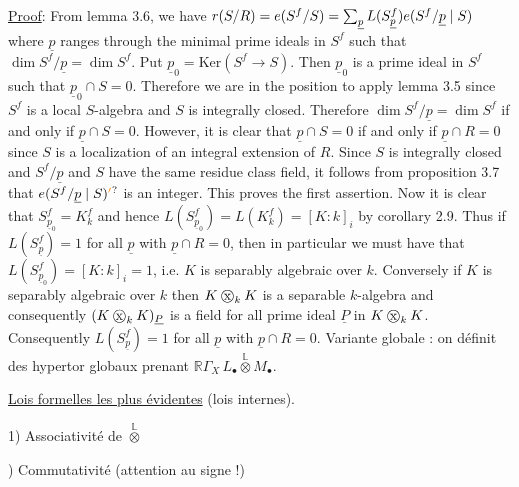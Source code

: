\uline{Proof}: From lemma 3.6, we have $r(S/R)=e(S^f/S)=\sum_{\underline p}L(S^f_{\underline p})e(S^f/\underline p\mid S)$ where $\underline p$ ranges through the minimal prime ideals in $S^f$ such that $\dim S^f/\underline p=\dim S^f$. Put $\underline p_0=\mathrm{Ker}(S^f\longrightarrow S)$. Then $\underline p_0$ is a prime ideal in $S^f$ such that $\underline p_0\cap S=0$. Therefore we are in the position to apply lemma 3.5 since $S^f$ is a local $S$-algebra and $S$ is integrally closed. Therefore $\dim S^f/\underline p=\dim S^f$ if and only if $\underline p\cap S=0$. However, it is clear that $\underline p\cap S=0$ if and only if $\underline p\cap R=0$ since $S$ is a localization of an integral extension of $R$. Since $S$ is integrally closed and $S^f/\underline p$ and $S$ have the same residue class field, it follows from proposition 3.7 that $e(S^f/\underline p\mid S\handwritten{)}\unsure{'}$ is an integer. This proves the first assertion. Now it is clear that $S^f_{\underline p_0}=K^f_k$ and hence $L(S^f_{\underline p_0})=L(K^f_k)=[K:k]_i$ by corollary 2.9. Thus if $L(S^f_{\underline p})=1$ for all $\underline p$ with $\underline p\cap R=0$, then in particular we must have that $L(S^f_{\underline p_0})=[K:k]_i=1$, i.e. $K$ is separably algebraic over $k$. Conversely if $K$ is separably algebraic over $k$ then $K\mathbin{\ooalign{\hfil$\mathrm{x}$\hfil\cr\hfil$\handwritten{\bigcirc}$\hfil\cr}}_k K$ is a separable $k$-algebra and consequently $(K\mathbin{\ooalign{\hfil$\mathrm{x}$\hfil\cr\hfil$\handwritten{\bigcirc}$\hfil\cr}}_k K)_{\underline P}$ is a field for all prime ideal $\underline P$ in $K\mathbin{\ooalign{\hfil$\mathrm{x}$\hfil\cr\hfil$\handwritten{\bigcirc}$\hfil\cr}}_k K$. Consequently $L(S^f_{\underline p})=1$ for all $\underline p$ with $\underline p\cap R=0$.
Variante globale : on définit des hypertor globaux  prenant $\mathbb R\Gamma_X\,L_{\bullet}\overset{\mathbb L}{\otimes}M_{\bullet}$.

\uline{Lois formelles les plus évidentes} (lois internes).

1) Associativité de $\overset{\mathbb L}{\otimes}$

) Commutativité (attention au signe !)

